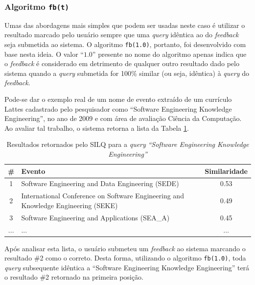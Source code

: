 \documentclass[12pt]{article}
\newcommand{\quotes}[1]{``#1''}
\begin{document}
\subsubsection{Algoritmo \texttt{fb(t)}}

Umas das abordagens mais simples que podem ser usadas neste caso é utilizar o resultado marcado pelo usuário sempre que uma \textit{query} idêntica ao do \textit{feedback} seja submetida ao sistema. O algoritmo \texttt{fb(1.0)}, portanto, foi desenvolvido com base nesta ideia. O valor \quotes{$1.0$} presente no nome do algoritmo apenas indica que o \textit{feedback} é considerado em detrimento de qualquer outro resultado dado pelo sistema quando a \textit{query} submetida for 100\% similar (ou seja, idêntica) à \textit{query} do \textit{feedback}.

Pode-se dar o exemplo real de um nome de evento extraído de um currículo Lattes cadastrado pelo pesquisador como \quotes{Software Engineering Knowledge Engineering}, no ano de 2009 e com área de avaliação Ciência da Computação. Ao avaliar tal trabalho, o sistema retorna a lista da Tabela \ref{tab:exemplo-fb1}.

\begin{table}[!h]
\begin{center}
\caption{Resultados retornados pelo SILQ para a \textit{query} \textit{\quotes{Software Engineering Knowledge Engineering}}} \label{tab:exemplo-fb1}
\begin{tabular}{ c | p{7cm} | c }
\hline
\textbf{\#} & \textbf{Evento} & \textbf{Similaridade} \\ \hline
1 & Software Engineering and Data Engineering (SEDE) & 0.53 \\ \hline
2 & International Conference on Software Engineering and Knowledge Engineering (SEKE) & 0.49 \\ \hline
3 & Software Engineering and Applications (SEA\_A) & 0.45 \\ \hline
... & ... & ... \\
\hline
\end{tabular}
\end{center}
\end{table}

Após analisar esta lista, o usuário submeteu um \textit{feedback} ao sistema marcando o resultado \#2 como o correto. Desta forma, utilizando o algoritmo \texttt{fb(1.0)}, toda \textit{query} subsequente idêntica a \quotes{Software Engineering Knowledge Engineering} terá o resultado \#2 retornado na primeira posição.
\end{document}
